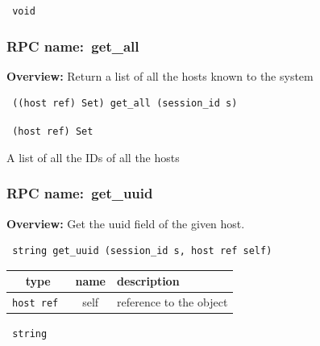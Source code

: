 \vspace{0.3cm}

{\tt 
void
}



\vspace{0.3cm}
\vspace{0.3cm}
\vspace{0.3cm}
\subsubsection{RPC name:~get\_all}

{\bf Overview:} 
Return a list of all the hosts known to the system

\begin{verbatim} ((host ref) Set) get_all (session_id s)\end{verbatim}


\vspace{0.3cm}

{\tt 
(host ref) Set
}


A list of all the IDs of all the hosts
\vspace{0.3cm}
\vspace{0.3cm}
\vspace{0.3cm}
\subsubsection{RPC name:~get\_uuid}

{\bf Overview:} 
Get the uuid field of the given host.

\begin{verbatim} string get_uuid (session_id s, host ref self)\end{verbatim}



 
\vspace{0.3cm}
\begin{tabular}{|c|c|p{7cm}|}
 \hline
{\bf type} & {\bf name} & {\bf description} \\ \hline
{\tt host ref } & self & reference to the object \\ \hline 

\end{tabular}

\vspace{0.3cm}

{\tt 
string
}



